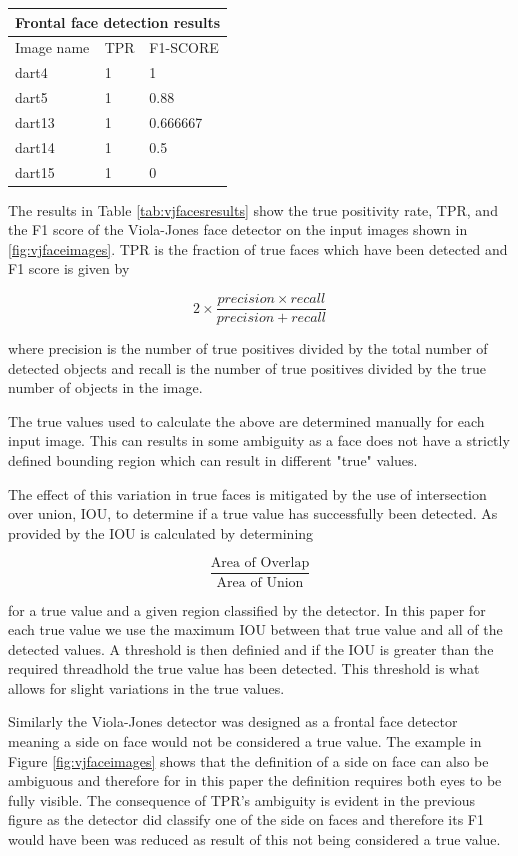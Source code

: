 \documentclass{article}
\begin{document}
\begin{multicols}{2}
\begin{tabular}{ |p{2cm}||p{2cm}|p{2cm}| }
 \hline
 \multicolumn{3}{|c|}{Frontal face detection results} \\
 \hline
 Image name & TPR & F1-SCORE \\
 \hline
 dart4  & 1   & 1         \\
 dart5  & 1   & 0.88      \\
 dart13 & 1   & 0.666667  \\ 
 dart14 & 1   & 0.5       \\ 
 dart15 & 1   & 0         \\ 
 \hline
\end{tabular}
\label{tab:vjfacesresults}

\bigskip

The results in Table \ref{tab:vjfacesresults} show the true positivity rate, TPR, and the F1 score of the Viola-Jones face detector on the input images shown in \ref{fig:vjfaceimages}. TPR is the fraction of true faces which have been detected and F1 score is given by

\[ 2 \times \frac{precision \times recall}{precision + recall} \]

where precision is the number of true positives divided by the total number of detected objects and recall is the number of true positives divided by the true number of objects in the image.

The true values used to calculate the above are determined manually for each
input image. This can results in some ambiguity as a face does not have a
strictly defined bounding region which can result in different "true" values. 

The effect of this variation in true faces is mitigated by the use of intersection over union, IOU, to determine if a true value has successfully been detected. As provided by \cite{iou} the IOU is calculated by determining 

\[ \frac{\mbox{Area of Overlap}}{\mbox{Area of Union}}\] 

for a true value and a given region classified by the detector. In this paper
for each true value we use the maximum IOU between that true value and all of
the detected values. A threshold is then definied and if the IOU is greater
than the required threadhold the true value has been detected. This threshold
is what allows for slight variations in the true values.

Similarly the Viola-Jones detector was designed as a
frontal face detector meaning a side on face would not be considered a true
value. The example in Figure \ref{fig:vjfaceimages} shows that the definition
of a side on face can also be ambiguous and therefore for in this paper the
definition requires both eyes to be fully visible. The consequence of TPR's
ambiguity is evident in the previous figure as the detector did classify one of
the side on faces and therefore its F1 would have been was reduced as result of
this not being considered a true value.


\end{multicols}
\end{document}
